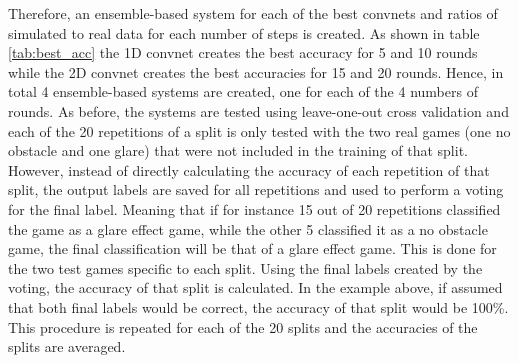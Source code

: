 Therefore, an ensemble-based system for each of the best convnets and ratios of simulated to real data for each number of steps is created. As shown in table \ref{tab:best_acc} the 1D convnet creates the best accuracy for 5 and 10 rounds while the 2D convnet creates the best accuracies for 15 and 20 rounds. Hence, in total 4 ensemble-based systems are created, one for each of the 4 numbers of rounds. As before, the systems are tested using leave-one-out cross validation and each of the 20 repetitions of a split is only tested with the two real games (one no obstacle and one glare) that were not included in the training of that split. However, instead of directly calculating the accuracy of each repetition of that split, the output labels are saved for all repetitions and used to perform a voting for the final label. Meaning that if for instance 15 out of 20 repetitions classified the game as a glare effect game, while the other 5 classified it as a no obstacle game, the final classification will be that of a glare effect game. This is done for the two test games specific to each split. Using the final labels created by the voting, the accuracy of that split is calculated. In the example above, if assumed that both final labels would be correct, the accuracy of that split would be 100\%. This procedure is repeated for each of the 20 splits and the accuracies of the splits are averaged. 

